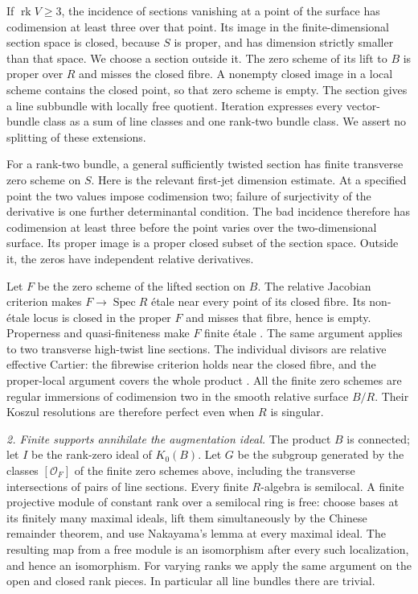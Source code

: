 If $\operatorname{rk}V\geq3$, the incidence of sections vanishing
at a point of the surface has codimension at least three over
that point. Its image in the finite-dimensional section space
is closed, because $S$ is proper, and has dimension strictly
smaller than that space. We choose a section outside it.
The zero scheme of its lift to $B$ is proper over $R$ and misses
the closed fibre. A nonempty closed image in a local scheme
contains the closed point, so that zero scheme is empty.
The section gives a line subbundle with locally free quotient.
Iteration expresses every vector-bundle class as a sum of line
classes and one rank-two bundle class. We assert no splitting
of these extensions.

For a rank-two bundle, a general sufficiently twisted section
has finite transverse zero scheme on $S$. Here is the relevant
first-jet dimension estimate. At a specified point the two
values impose codimension two; failure of surjectivity of the
derivative is one further determinantal condition. The bad
incidence therefore has codimension at least three before the
point varies over the two-dimensional surface. Its proper
image is a proper closed subset of the section space.
Outside it, the zeros have independent relative derivatives.

Let $F$ be the zero scheme of the lifted section on $B$.
The relative Jacobian criterion makes $F\to\operatorname{Spec}R$
\'etale near every point of its closed fibre. Its non-\'etale
locus is closed in the proper $F$ and misses that fibre, hence
is empty. Properness and quasi-finiteness make $F$ finite
\'etale \citep[Lemma 37.44.1]{frNKStacksProperFinite}.
The same argument applies to two transverse high-twist line
sections. The individual divisors are relative effective
Cartier: the fibrewise criterion holds near the closed fibre,
and the proper-local argument covers the whole product
\citep[Lemma 31.19.9(3)]{frNKStacksRelativeCartier}.
All the finite zero schemes are regular immersions of
codimension two in the smooth relative surface $B/R$.
Their Koszul resolutions are therefore perfect even when $R$
is singular.

\emph{2. Finite supports annihilate the augmentation ideal.}
The product $B$ is connected; let $I$ be the rank-zero ideal of
$K_0(B)$. Let $G$ be the subgroup generated by the classes
$[\mathcal O_F]$ of the finite zero schemes above, including
the transverse intersections of pairs of line sections.
Every finite $R$-algebra is semilocal. A finite projective
module of constant rank over a semilocal ring is free:
choose bases at its finitely many maximal ideals, lift them
simultaneously by the Chinese remainder theorem, and use
Nakayama's lemma at every maximal ideal. The resulting map
from a free module is an isomorphism after every such
localization, and hence an isomorphism. For varying ranks
we apply the same argument on the open and closed rank
pieces. In particular all line bundles there are trivial.

